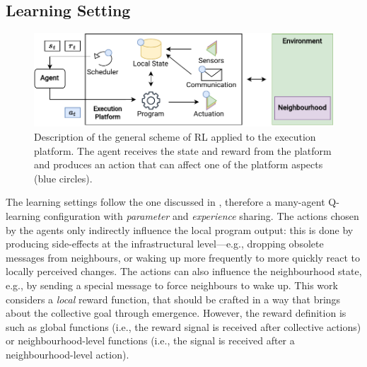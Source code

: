 \subsection{Learning Setting}\label{acsos2022:sec:learning-setting}

\begin{figure}
	\centering
    \includegraphics[width=\linewidth]{papers/acsos2022/img//rl-architecture.pdf}
    \caption[Description of the general scheme of \ac{RL} applied to the execution platform.]{Description of the general scheme of \ac{RL} applied to the execution platform. 
    The agent receives the state and reward from the platform and produces an action that can affect one of the platform aspects (blue circles).}
    \label{acsos2022:fig:rl-and-ac}
\end{figure}
The learning settings follow the one discussed in ,
 therefore a many-agent Q-learning configuration with \emph{parameter} and \emph{experience} sharing.
%
%
The actions chosen by the agents only indirectly influence the local program output: 
 this is done by producing side-effects at the infrastructural level---e.g., 
 dropping obsolete messages from neighbours, 
 or waking up more frequently to more quickly 
 react to locally perceived changes.
%
The actions can also influence the neighbourhood state, e.g., by sending a special message to force neighbours to wake up.
%
This work considers a \emph{local} reward function, that should be crafted in a way that brings about the collective goal through emergence. 
%
However, the reward definition is   
such as global functions (i.e., the reward signal is received after collective actions) or neighbourhood-level functions (i.e., the signal is received after a neighbourhood-level action).

